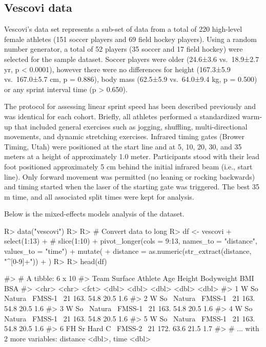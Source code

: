 \documentclass[
]{jss}
\begin{document}
\hypertarget{vescovi-data}{%
\subsection{Vescovi data}\label{vescovi-data}}

Vescovi's data set represents a sub-set of data from a total of 220 high-level female athletes (151 soccer players and 69 field hockey players). Using a random number generator, a total of 52 players (35 soccer and 17 field hockey) were selected for the sample dataset. Soccer players were older (24.6±3.6 vs.~18.9±2.7 yr, p \textless{} 0.0001), however there were no differences for height (167.3±5.9 vs.~167.0±5.7 cm, p = 0.886), body mass (62.5±5.9 vs.~64.0±9.4 kg, p = 0.500) or any sprint interval time (p \textgreater{} 0.650).

The protocol for assessing linear sprint speed has been described previously \citep{vescoviImpactMaximumSpeed2014, vescoviLocomotorHeartRateMetabolic2016, vescoviSprintSpeedCharacteristics2012} and was identical for each cohort. Briefly, all athletes performed a standardized warm-up that included general exercises such as jogging, shuffling, multi-directional movements, and dynamic stretching exercises. Infrared timing gates (Brower Timing, Utah) were positioned at the start line and at 5, 10, 20, 30, and 35 meters at a height of approximately 1.0 meter. Participants stood with their lead foot positioned approximately 5 cm behind the initial infrared beam (i.e., start line). Only forward movement was permitted (no leaning or rocking backwards) and timing started when the laser of the starting gate was triggered. The best 35 m time, and all associated split times were kept for analysis.

Below is the mixed-effects models analysis of the dataset.

\begin{CodeChunk}
\begin{CodeInput}
R> data("vescovi")
R> 
R> # Convert data to long
R> df <- vescovi %
+   select(1:13) %
+   # slice(1:10) %
+   pivot_longer(cols = 9:13, names_to = "distance", values_to = "time") %
+   mutate(
+     distance = as.numeric(str_extract(distance, "^[0-9]+"))
+   )
R> 
R> head(df)
\end{CodeInput}
\begin{CodeOutput}
#> # A tibble: 6 x 10
#>   Team  Surface Athlete   Age Height Bodyweight   BMI   BSA
#>   <chr> <chr>   <fct>   <dbl>  <dbl>      <dbl> <dbl> <dbl>
#> 1 W So~ Natura~ FMSS-1~    21   163.       54.8  20.5   1.6
#> 2 W So~ Natura~ FMSS-1~    21   163.       54.8  20.5   1.6
#> 3 W So~ Natura~ FMSS-1~    21   163.       54.8  20.5   1.6
#> 4 W So~ Natura~ FMSS-1~    21   163.       54.8  20.5   1.6
#> 5 W So~ Natura~ FMSS-1~    21   163.       54.8  20.5   1.6
#> 6 FH Sr Hard C~ FMSS-2~    21   172.       63.6  21.5   1.7
#> # ... with 2 more variables: distance <dbl>, time <dbl>
\end{CodeOutput}
\end{CodeChunk}
\end{document}
